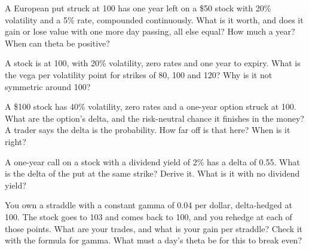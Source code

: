 \begin{question}\label{iq:iv2:options-parity-and-greeks:21}
A European put struck at 100 has one year left on a \$50 stock with 20\% volatility and a 5\% rate, compounded continuously. What is it worth, and does it gain or lose value with one more day passing, all else equal? How much a year? When can theta be positive?
\end{question}

\begin{question}\label{iq:iv2:options-parity-and-greeks:22}
A stock is at 100, with 20\% volatility, zero rates and one year to expiry. What is the vega per volatility point for strikes of 80, 100 and 120? Why is it not symmetric around 100?
\end{question}

\begin{question}\label{iq:iv2:options-parity-and-greeks:23}
A \$100 stock has 40\% volatility, zero rates and a one-year option struck at 100. What are the option's delta, and the risk-neutral chance it finishes in the money? A trader says the delta is the probability. How far off is that here? When is it right?
\end{question}

\begin{question}\label{iq:iv2:options-parity-and-greeks:24}
A one-year call on a stock with a dividend yield of 2\% has a delta of 0.55. What is the delta of the put at the same strike? Derive it. What is it with no dividend yield?
\end{question}

\begin{question}\label{iq:iv2:options-parity-and-greeks:25}
You own a straddle with a constant gamma of 0.04 per dollar, delta-hedged at 100. The stock goes to 103 and comes back to 100, and you rehedge at each of those points. What are your trades, and what is your gain per straddle? Check it with the formula for gamma. What must a day's theta be for this to break even?
\end{question}


